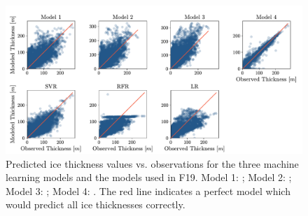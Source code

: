 \begin{figure}[!tp]
	\centering		  
	\includegraphics[height=0.7\textwidth, angle=90, origin=c]{figures/physical_comp.pdf}
	\caption{Predicted ice thickness values vs. observations for the three machine learning models and the models used in F19. Model 1: \citet{Huss2012}; Model 2: \citet{Frey2014}; Model 3: \citet{OGGM2019}; Model 4: \citet{Furst2017}. The red line indicates a perfect model which would predict all ice thicknesses correctly.}
	\label{fig:thick-dist}
\end{figure}

